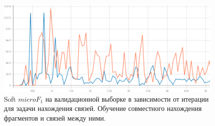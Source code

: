 \documentclass[12pt]{article}
\begin{document}
\begin{figure}[h]
    \centering
    \includegraphics[width=\textwidth]{images/smooth_rel_f1.png}
    \caption{Soft $micro F_1$ на валидационной выборке в зависимости от итерации для задачи нахождения связей. Обучение совместного нахождения фрагментов и связей между ними.}
    \label{fig:ner_micro_f}
\end{figure}
\end{document}
